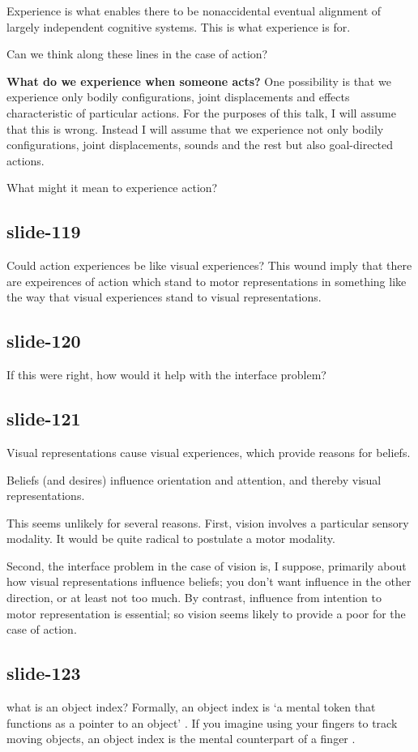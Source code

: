 \documentclass[12pt,\papersize]{extarticle}
\begin{document}
Experience is what enables there to be nonaccidental eventual alignment of largely independent
cognitive systems. This is what experience is for.
 
Can we think along these lines in the case of action?
 
\textbf{What do we experience when someone acts?}
One possibility is that we experience only bodily configurations, joint displacements and
effects characteristic of particular actions.
For the purposes of this talk, I will assume that this is wrong.
Instead I will assume that we experience not only bodily configurations, joint displacements,
sounds and the rest but also goal-directed actions.
 
What might it mean to experience action?
 
\subsection{slide-119}
Could action experiences be like visual experiences?
This wound imply that there are expeirences of action which stand to motor representations
in something like the way that visual experiences stand
to visual representations.
 
\subsection{slide-120}
If this were right, how would it help with the interface problem?
 
\subsection{slide-121}
Visual representations cause visual experiences, which provide reasons for beliefs.
 
Beliefs (and desires) influence orientation and attention, and thereby visual representations.
 
This seems unlikely for several reasons.
First, vision involves a particular sensory modality. It would be quite radical to
postulate a motor modality.
 
Second, the interface problem in the case of vision is, I suppose, primarily about how
visual representations influence beliefs;
you don’t want influence in the other direction, or at least not too much.
By contrast, influence from intention to motor representation is essential;
so vision seems likely to provide a poor
for the case of action.
 
\subsection{slide-123}
what is an object index? Formally, an object index is ‘a mental token that functions as a pointer to
an object’ \citep[p.\ 11]{Leslie:1998zk}. If you imagine using your fingers to track moving objects,
an object index is the mental counterpart of a finger \citep[p.~68]{pylyshyn:1989_role}.
 
\end{document}
